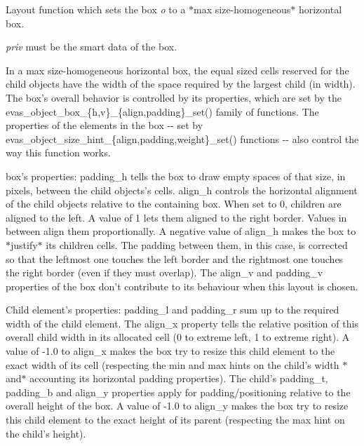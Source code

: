 Layout function which sets the box {\itshape o\/} to a $\ast$max size-\/homogeneous$\ast$ horizontal box. 

{\itshape priv\/} must be the smart data of the box.

In a max size-\/homogeneous horizontal box, the equal sized cells reserved for the child objects have the width of the space required by the largest child (in width). The box's overall behavior is controlled by its properties, which are set by the evas\_\-object\_\-box\_\-\{h,v\}\_\-\{align,padding\}\_\-set() family of functions. The properties of the elements in the box -\/-\/ set by evas\_\-object\_\-size\_\-hint\_\-\{align,padding,weight\}\_\-set() functions -\/-\/ also control the way this function works.

\begin{DoxyParagraph}{box's properties:}
{\ttfamily padding\_\-h} tells the box to draw empty spaces of that size, in pixels, between the child objects's cells. {\ttfamily align\_\-h} controls the horizontal alignment of the child objects relative to the containing box. When set to 0, children are aligned to the left. A value of 1 lets them aligned to the right border. Values in between align them proportionally. A negative value of {\ttfamily align\_\-h} makes the box to $\ast$justify$\ast$ its children cells. The padding between them, in this case, is corrected so that the leftmost one touches the left border and the rightmost one touches the right border (even if they must overlap). The {\ttfamily align\_\-v} and {\ttfamily padding\_\-v} properties of the box don't contribute to its behaviour when this layout is chosen.
\end{DoxyParagraph}
\begin{DoxyParagraph}{Child element's properties:}
{\ttfamily padding\_\-l} and {\ttfamily padding\_\-r} sum up to the required width of the child element. The {\ttfamily align\_\-x} property tells the relative position of this overall child width in its allocated cell (0 to extreme left, 1 to extreme right). A value of -\/1.0 to {\ttfamily align\_\-x} makes the box try to resize this child element to the exact width of its cell (respecting the min and max hints on the child's width $\ast$and$\ast$ accounting its horizontal padding properties). The child's {\ttfamily padding\_\-t}, {\ttfamily padding\_\-b} and {\ttfamily align\_\-y} properties apply for padding/positioning relative to the overall height of the box. A value of -\/1.0 to {\ttfamily align\_\-y} makes the box try to resize this child element to the exact height of its parent (respecting the max hint on the child's height). 
\end{DoxyParagraph}


